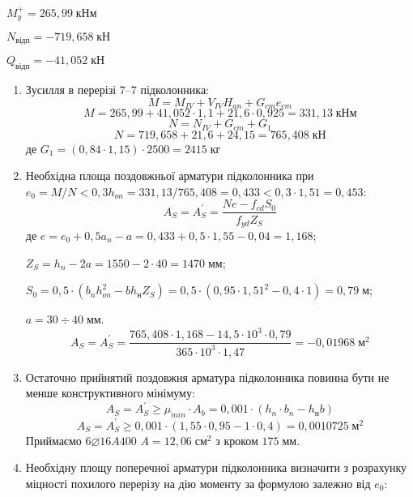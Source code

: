 \documentclass[a4paper,14pt]{article}
\begin{document}
        $M_y^+ = 265,99\;\textit{кНм}$
        
        $N_{\textit{відп}} = - 719,658\;\textit{кН}$
   
        $Q_{\textit{відп}} = - 41,052\;\textit{кН}$
\begin{enumerate}
    \item Зусилля в перерізі 7–7 підколонника:
        \begin{equation}
            M = M_{IV} + V_{IV}H_{an} + G_{cm}e_{cm}
        \end{equation}
        $$M = 265,99 + 41,052 \cdot 1,1 + 21,6 \cdot 0,925 = 331,13\;\textit{кНм}$$
        \begin{equation}
            N = N_{IV} + G_{cm} + G_1
        \end{equation}
        $$N = 719,658 + 21,6 + 24,15 = 765,408\;\textit{кН}$$
        де $G_1 = (0,84 \cdot 1,15) \cdot 2500 = 2415\;\textit{кг}$
    \item Необхідна площа поздовжньої арматури підколонника при\\$e_0 = M / N < 0,3h_{on} = 331,13 / 765,408 = 0,433 < 0,3 \cdot 1,51 = 0,453$:
        \begin{equation}
            A_S = A_S^{\prime} = \dfrac{Ne - f_{cd}S_0}{f_{yd}Z_S}
        \end{equation}
        де $e = e_0 + 0,5a_n - a = 0,433 + 0,5 \cdot 1,55 - 0,04 = 1,168$;

        $Z_S = h_n - 2a = 1550 - 2 \cdot 40 = 1470\;\textit{мм}$;

        $S_0 = 0,5 \cdot (b_nh_{on}^2 - bh_{\textit{н}}Z_S) = 0,5 \cdot (0,95 \cdot 1,51^2 - 0,4 \cdot 1) = 0,79\;\textit{м}$;

        $a = 30 \div 40\;\textit{мм}$.
        $$A_S = A_S^{\prime} = \dfrac{765,408 \cdot 1,168 - 14,5 \cdot 10^3 \cdot 0,79}{365 \cdot 10^3 \cdot 1,47} = - 0,01968\;\textit{м}^2$$
    \item Остаточно прийнятий поздовжня арматура підколонника повинна бути не менше конструктивного мінімуму:
        \begin{equation}
            A_S = A_S^{\prime} \geq \mu_{min} \cdot A_b = 0,001 \cdot (h_n \cdot b_n - h_{\textit{н}}b)
        \end{equation}
        $$A_S = A_S^{\prime} \geq 0,001 \cdot (1,55 \cdot 0,95 - 1 \cdot 0,4) = 0,0010725\;\textit{м}^2$$
        Приймаємо $6\varnothing16A400$ $A = 12,06\;\textit{см}^2$ з кроком $175\;\textit{мм}$.
    \item Необхідну площу поперечної арматури підколонника визначити з розрахунку міцності похилого перерізу на дію моменту за формулою залежно від $e_0$:
    

\end{enumerate}
\end{document}
